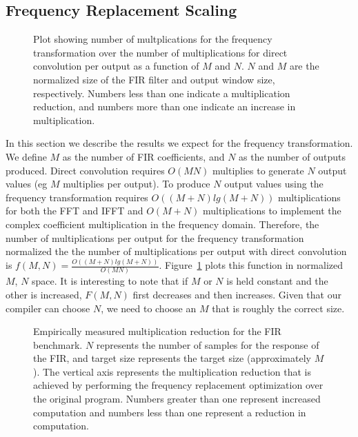 \subsection{Frequency Replacement Scaling}
\begin{figure}
\center
\epsfxsize=3.0in
\caption{Plot showing number of multplications for the frequency transformation over the number of multiplications for direct convolution per output as a function of $M$ and $N$. $N$ and $M$ are the normalized size of the FIR filter and output window size, respectively. Numbers less than one indicate a multiplication reduction, and numbers more than one indicate an increase in multiplication.}
\label{fig:frequency-win}
\end{figure}

In this section we describe the results we expect for the frequency transformation. We
define $M$ as the number of FIR coefficients, and $N$ as the number of outputs produced. Direct 
convolution requires $O(MN)$ multiplies to generate $N$ output values 
(eg $M$ multiplies per output). To produce $N$ output values using the frequency transformation 
requires $O((M+N)lg(M+N))$ multiplications for both the FFT and IFFT and $O(M+N)$ 
multiplications to implement the complex coefficient multiplication in the frequency domain.
Therefore, the number of multiplications per output for the frequency transformation
normalized the the number of multiplications per output with direct convolution is
$f(M,N)=\frac{O((M+N)lg(M+N))}{O(MN)}$. Figure~\ref{fig:frequency-win} plots this function
in normalized $M$, $N$ space. It is interesting to note that if $M$ or $N$ is held constant 
and the other is increased, $F(M,N)$ first decreases and then increases. Given that our compiler
can choose $N$, we need to choose an $M$ that is roughly the correct size.

\begin{figure}
\center
\epsfxsize=3.0in
\caption{Empirically measured multiplication reduction for the FIR benchmark. $N$ represents the number of samples for the response of the FIR, and target size represents the target size (approximately $M$). The vertical axis represents the multiplication reduction that is achieved by performing the frequency replacement optimization over the original program. Numbers greater than one represent increased computation and numbers less than one represent a reduction in computation. }
\label{fig:frequency-win-empirical}
\end{figure}


